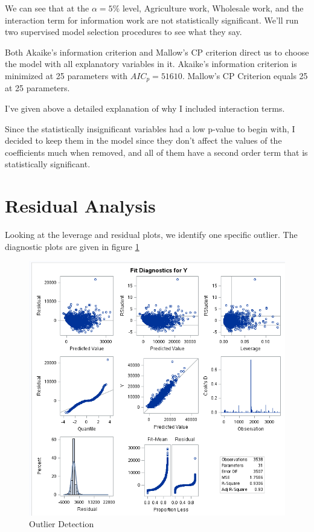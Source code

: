 We can see that at the $\alpha=5\%$ level, Agriculture work, Wholesale work, and the interaction term for information work are not statistically significant. We'll run two supervised model selection procedures to see what they say.

Both Akaike's information criterion and Mallow's CP criterion direct us to choose the model with all explanatory variables in it. Akaike's information criterion is minimized at 25 parameters with $AIC_p = 51610$. Mallow's CP Criterion equals 25 at 25 parameters. 

I've given above a detailed explanation of why I included interaction terms. 


Since the statistically insignificant variables had a low p-value to begin with, I decided to keep them in the model since they don't affect the values of the coefficients much when removed, and all of them have a second order term that is statistically significant. 

\section{Residual Analysis}

Looking at the leverage and residual plots, we identify one specific outlier. The diagnostic plots are given in figure \ref{fig:resid}

\begin{figure}
\centering
\includegraphics{Chapters/outlier.png}
\caption{Outlier Detection}
\label{fig:resid}
\end{figure}

